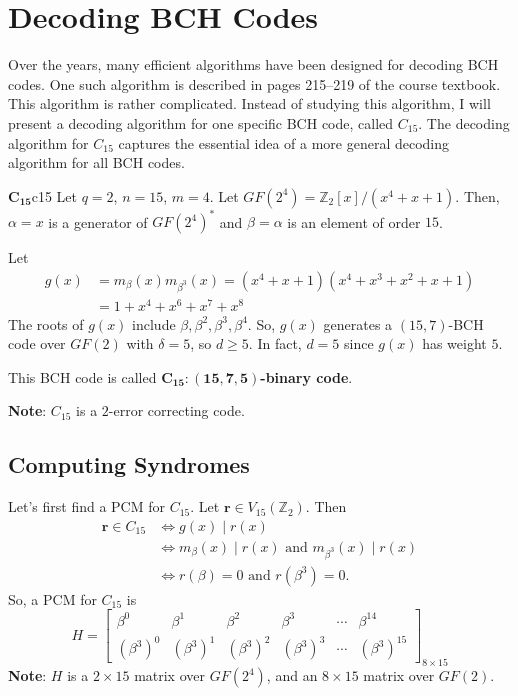\section{Decoding BCH Codes}
Over the years, many efficient algorithms have been designed for decoding
BCH codes. One such algorithm is described in pages 215--219 of the
course textbook. This algorithm is rather complicated. Instead of studying
this algorithm, I will present a decoding algorithm for one specific
BCH code, called $ C_{15} $. The decoding algorithm for $ C_{15} $
captures the essential idea of a more general decoding algorithm for all
BCH codes.


\begin{Definition}{$ \symbf{C_{15}} $}{c15}
    Let $ q=2 $, $ n=15 $, $ m=4 $. Let $ GF(2^4)=\mathbb{Z}_2[x]/(x^4+x+1) $.
    Then, $ \alpha=x $ is a generator of $ GF(2^4)^* $ and $ \beta=\alpha $
    is an element of order $ 15 $.

    Let
    \begin{align*}
        g(x)
         & =m_{\beta}(x)m_{\beta^3}(x)=(x^4+x+1)(x^4+x^3+x^2+x+1) \\
         & =1+x^4+x^6+x^7+x^8
    \end{align*}
    The roots of $ g(x) $ include $ \beta,\beta^2,\beta^3,\beta^4 $. So,
    $ g(x) $ generates a $ (15,7) $-BCH code over $ GF(2) $
    with $ \delta=5 $, so $ d\geqslant 5 $. In fact, $ d=5 $
    since $ g(x) $ has weight $ 5 $.

    This BCH code is called \textbf{$ \symbf{C_{15}:(15,7,5)} $-binary code}.

    \textbf{Note}: $ C_{15} $ is a $ 2 $-error correcting code.
\end{Definition}


\subsection*{Computing Syndromes}
Let's first find a PCM for $ C_{15} $. Let $ \symbf{r}\in V_{15}(\mathbb{Z}_2) $.
Then
\begin{align*}
    \symbf{r}\in C_{15}
     & \iff g(x)\mid r(x)                                            \\
     & \iff m_{\beta}(x)\mid r(x)\text{ and }m_{\beta^3}(x)\mid r(x) \\
     & \iff r(\beta)=0\text{ and } r(\beta^3)=0.
\end{align*}
So, a PCM for $ C_{15} $ is
\[ H=
    \begin{bmatrix}
        \beta^0     & \beta^1     & \beta^2     & \beta^3     & \cdots & \beta^{14}     \\
        (\beta^3)^0 & (\beta^3)^1 & (\beta^3)^2 & (\beta^3)^3 & \cdots & (\beta^3)^{15}
    \end{bmatrix}_{8\times 15} \]
\textbf{Note}: $ H $ is a $ 2\times 15 $ matrix over $ GF(2^4) $,
and an $ 8\times 15 $ matrix over $ GF(2) $.

